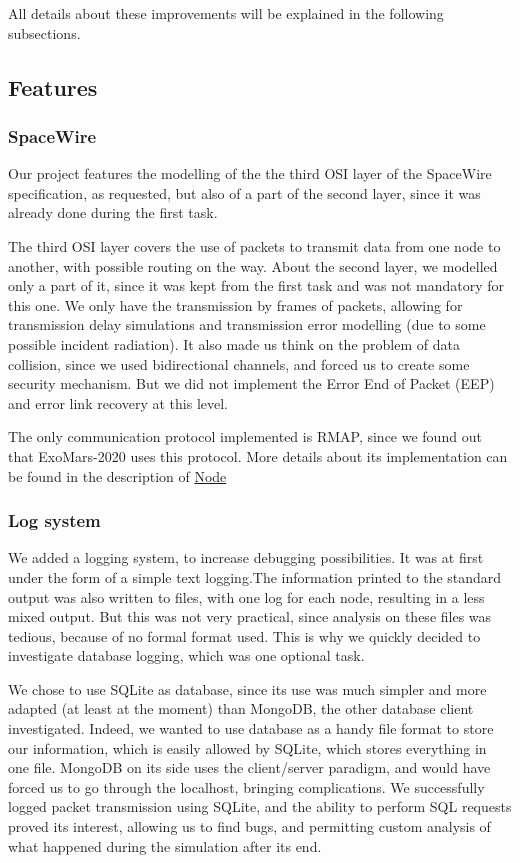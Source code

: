 \documentclass[12pt,a4paper]{article}
\begin{document}
All details about these improvements will be explained in the following subsections.

\subsection{Features}
\subsubsection*{SpaceWire}
Our project features the modelling of the the third OSI layer of the SpaceWire specification, as requested, but also of a part of the second layer, since it was already done during the first task.

The third OSI layer covers the use of packets to transmit data from one node to another, with possible routing on the way. About the second layer, we modelled only a part of it, since it was kept from the first task and was not mandatory for this one. We only have the transmission by frames of packets, allowing for transmission delay simulations and transmission error modelling (due to some possible incident radiation). It also made us think on the problem of data collision, since we used bidirectional channels, and forced us to create some security mechanism. But we did not implement the Error End of Packet (EEP) and error link recovery at this level.

The only communication protocol implemented is RMAP, since we found out that ExoMars-2020 uses this protocol. More details about its implementation can be found in the description of \hyperref[ssec:Node]{Node}
\subsubsection*{Log system}
We added a logging system, to increase debugging possibilities. It was at first under the form of a simple text logging.The information printed to the standard output was also written to files, with one log for each node, resulting in a less mixed output. But this was not very practical, since analysis on these files was tedious, because of no formal format used. This is why we quickly decided to investigate database logging, which was one optional task.

We chose to use SQLite as database, since its use was much simpler and more adapted (at least at the moment) than MongoDB, the other database client investigated. Indeed, we wanted to use database as a handy file format to store our information, which is easily allowed by SQLite, which stores everything in one file. MongoDB on its side uses the client/server paradigm, and would have forced us to go through the localhost, bringing complications. We successfully logged packet transmission using SQLite, and the ability to perform SQL requests proved its interest, allowing us to find bugs, and permitting custom analysis of what happened during the simulation after its end.
\end{document}
